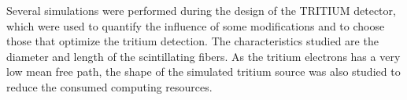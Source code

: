 Several simulations were performed during the design of the TRITIUM detector, which were used to quantify the influence of some modifications and to choose those that optimize the tritium detection. The characteristics studied are the diameter and length of the scintillating fibers. As the tritium electrons has a very low mean free path, the shape of the simulated tritium source was also studied to reduce the consumed computing resources. 